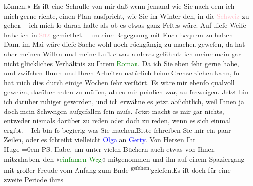                können.« Es iſt eine Schrulle von mir daß wenn jemand wie Sie nach dem ich mich gerne
               richte, einen Plan ausſpricht, wie Sie im Winter den, in die \textcolor{pink}{Schweiz}{}\ledrightnote{\textcolor{pink}{Schweiz}} zu gehen – ich mich ſo daran halte als ob es etwas ganz
               Feſtes wäre. Auf dieſe Weiſe habe ich in \textcolor{pink}{\textsc{Sils}}{}\ledrightnote{\textcolor{pink}{Sils im Engadin}} gemiethet – um eine Begegnung mit Euch {\pb}bequem zu haben. Dann im
                  Mai wäre dieſe Sache wohl noch rückgängig zu machen geweſen, da hat
               aber meinen Willen und meine Luſt etwas anderes gelähmt: ich meine mein gar nicht
               glückliches Verhältnis zu Ihrem \textcolor{green}{Roman}{}. Da ich Sie eben ſehr gerne habe, und zwiſchen Ihnen und Ihren
               Arbeiten natürlich keine Grenze ziehen kann, ſo hat mich dies {\pb}durch einige Wochen ſehr verſtört.
               Es wäre mir ebenſo qualvoll geweſen, darüber reden zu müſſen, als es mir peinlich
               war,  zu ſchweigen.\pend
           \pstart
           Jetzt bin ich darüber ruhiger geworden, und ich erwähne es jetzt abſichtlich, weil
               Ihnen ja doch mein Schweigen aufgefallen ſein muſs.\pend
           \pstart
           Jetzt macht es mir gar nichts, {\pb}entweder niemals darüber zu reden oder doch zu reden, wenn es sich einmal
               ergibt.\pend
           \pstart
           \numberlinefalse{}–\numberlinetrue{}\pend
           \pstart
           Ich bin ſo begierig was Sie machen.\hspace*{1.5em}Bitte ſchreiben
               Sie mir ein paar Zeilen, oder es ſchreibt vielleicht \textcolor{blue}{Olga}{}\ledrightnote{\textcolor{blue}{Olga Schnitzler}} an \textcolor{blue}{Gerty}{}\ledrightnote{\textcolor{blue}{Gertrude von Hofmannsthal}}.\pend
           \pstart
           Von Herzen Ihr{\\[\baselineskip]}\spacefill\mbox{Hugo}\pend
           \leftskip=0em{}\pstart
           \noindent{}PS. Habe, um unter vielen Büchern auch etwas von Ihnen mitzuhaben, den »\textcolor{green}{einſamen Weg}{}\ledrightnote{\textcolor{green}{Der einsame Weg. Schauspiel in fünf Akten}}« mitgenommen und ihn auf einem
                  Spaziergang mit großer Freude vom Anfang zum Ende \substVorne{}\textsuperscript{geſehen.}{\allowbreak}\substDazwischen{}geleſen.\substHinten{}\hspace*{1.5em}Es iſt doch für eine zweite Periode ihres
